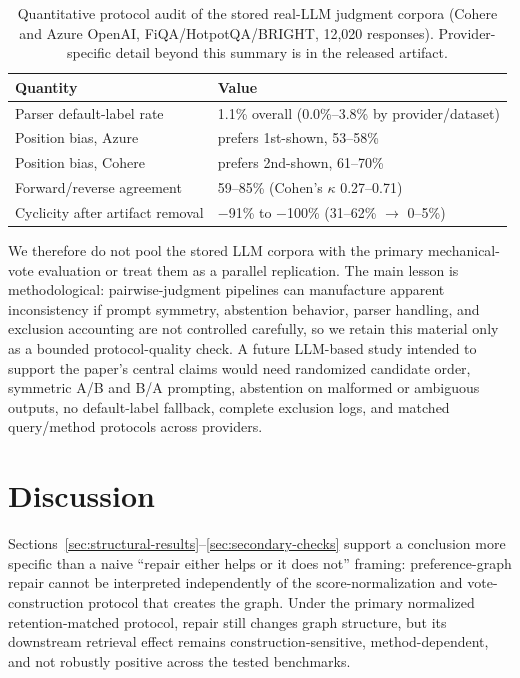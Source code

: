 \documentclass[manuscript,anonymous,review]{acmart}
\begin{document}
\begin{table}[t]
  \caption{Quantitative protocol audit of the stored real-LLM judgment
    corpora (Cohere and Azure OpenAI, FiQA/HotpotQA/BRIGHT, 12{,}020
    responses). Provider-specific detail beyond this summary is in the
    released artifact.}
  \label{tab:llm-audit}
  \begin{tabular}{ll}
    \toprule
    Quantity & Value \\
    \midrule
    Parser default-label rate & 1.1\% overall (0.0\%--3.8\% by provider/dataset) \\
    Position bias, Azure & prefers 1st-shown, 53--58\% \\
    Position bias, Cohere & prefers 2nd-shown, 61--70\% \\
    Forward/reverse agreement & 59--85\% (Cohen's $\kappa$ 0.27--0.71) \\
    Cyclicity after artifact removal & $-$91\% to $-$100\% (31--62\% $\to$ 0--5\%) \\
    \bottomrule
  \end{tabular}
\end{table}

We therefore do not pool the stored LLM corpora with the primary
mechanical-vote evaluation or treat them as a parallel replication. The main
lesson is methodological: pairwise-judgment pipelines can manufacture apparent
inconsistency if prompt symmetry, abstention behavior, parser handling, and
exclusion accounting are not controlled carefully, so we retain this material
only as a bounded protocol-quality check. A future LLM-based study intended to
support the paper's central claims would need randomized candidate order,
symmetric A/B and B/A prompting, abstention on malformed or ambiguous outputs,
no default-label fallback, complete exclusion logs, and matched query/method
protocols across providers.

\section{Discussion}
\label{sec:discussion}

Sections~\ref{sec:structural-results}--\ref{sec:secondary-checks} support a
conclusion more specific than a naive ``repair either helps or it does not''
framing: preference-graph repair cannot be interpreted independently of the
score-normalization and vote-construction protocol that creates the graph.
Under the primary normalized retention-matched protocol, repair still changes
graph structure, but its downstream retrieval effect remains
construction-sensitive, method-dependent, and not robustly positive across the
tested benchmarks.
\end{document}
